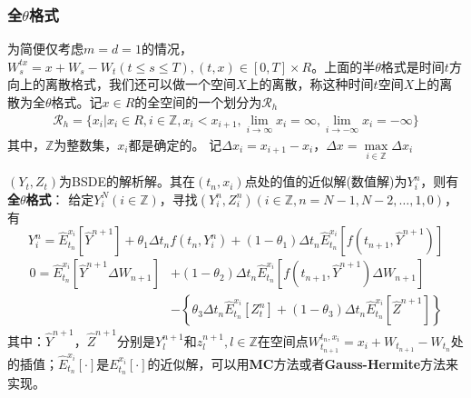 		\subsubsection{全$\theta$格式}
			为简便仅考虑$m=d=1$的情况，$W_s^{tx}=x+W_s-W_t(t \leqslant s \leqslant T) ,(t,x)\in [0,T] \times R$。上面的半$\theta$格式是时间$t$方向上的离散格式，我们还可以做一个空间$X$上的离散，称这种时间$t$空间$X$上的离散为全$\theta$格式。记$x \in R$的全空间的一个划分为$\mathcal{R}_h$
			\begin{align*}
			\mathcal{R}_h = \{x_i|x_i\in R,i\in \mathbb{Z},x_i<x_{i+1},\lim_{i\to \infty} x_i =\infty ,\lim_{i\to -\infty} x_i =-\infty\}
			\end{align*}
			其中，$\mathbb{Z}$为整数集，$x_i$都是确定的。
			记$\Delta {x}_i=x_{i+1}-x_{i}$，$\Delta {x}={\mathop {\max }\limits_{i \in \mathbb{Z}} }\Delta {x}_i$
			\par
			$(Y_t,Z_t)$为BSDE的解析解。其在$(t_n,x_i)$点处的值的近似解(数值解)为$Y_i^n$，则有\textbf{全$\theta$格式}：
			给定$Y_i^N(i \in \mathbb{Z})$，寻找$(Y_i^n,Z_i^n) (i \in \mathbb{Z},n=N-1,N-2,\ldots,1,0)$，有
					\begin{equation*}
					Y_i^n = \hat E_{{t_n}}^{{x_i}}\left[ {{{\hat Y}^{n + 1}}} \right] + {\theta _1}\Delta {t_n}f\left( {{t_n},Y_i^n} \right) + \left( {1 - {\theta _1}} \right)\Delta {t_n}\hat E_{{t_n}}^{{x_i}}\left[ {f\left( {{t_{n + 1}},{{\hat Y}^{n + 1}}} \right)} \right]
					\end{equation*}
							\begin{equation*}
							\begin{split}
						0 = \hat E_{{t_n}}^{{x_i}}\left[ {{{\hat Y}^{n + 1}} \Delta {W_{n + 1}}} \right] &+ \left( {1 - {\theta _2}} \right)\Delta {t_n}\hat E_{{t_n}}^{{x_i}}\left[ {f\left( {{t_{n + 1}},{{\hat Y}^{n + 1}}} \right)  \Delta {W_{n + 1}}} \right]\\
						&- \left\{ {{\theta _3}\Delta {t_n}\hat E_{{t_n}}^{{x_i}}\left[ {Z_t^n} \right] + \left( {1 - {\theta _3}} \right)\Delta {t_n}\hat E_{{t_n}}^{{x_i}}\left[ {{{\hat Z}^{n + 1}}} \right]} \right\}
							\end{split}
							\end{equation*}
			其中：${\hat Y}^{n + 1}$，${\hat Z}^{n + 1}$分别是${Y}_l^{n + 1}$和${z}_l^{n + 1},l \in \mathbb{Z}$在空间点$W_{{t_{n + 1}}}^{{t_n},{x_i}} = {x_i} + {W_{{t_{n + 1}}}} - {W_{{t_n}}}$处的插值；$\hat E_{{t_n}}^{{x_i}}\left[ \cdot \right]$是$ E_{{t_n}}^{{x_i}}\left[ \cdot \right]$的近似解，可以用\textbf{MC}方法或者\textbf{Gauss-Hermite}方法来实现。\\
